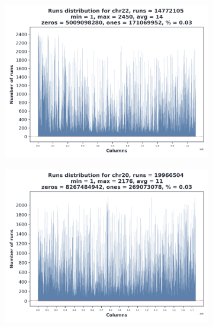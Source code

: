 \begin{figure}
  \centering
  \begin{subfigure}{.45\textwidth}
    \centering
    \includegraphics[width=\linewidth]{img/22_runs.png}
  \end{subfigure}%
  \begin{subfigure}{.45\textwidth}
    \centering
    \includegraphics[width=\linewidth]{img/20_runs.png}
  \end{subfigure}
  \begin{subfigure}{.45\textwidth}
    \centering

\end{subfigure}
\end{figure}
